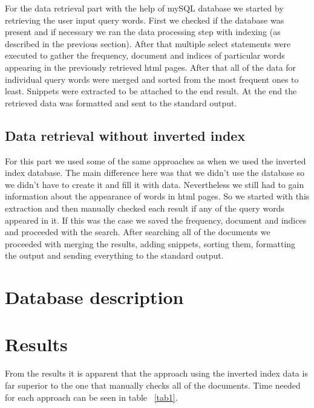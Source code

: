 \documentclass[9pt]{IEEEtran}
\begin{document}
For the data retrieval part with the help of mySQL database we started by retrieving the user input query words.
First we checked if the database was present and if necessary we ran the data processing step with indexing (as described in the previous section).
After that multiple select statements were executed to gather the frequency, document and indices of particular words appearing in the previously retrieved html pages.
After that all of the data for individual query words were merged and sorted from the most frequent ones to least.
Snippets were extracted to be attached to the end result.
At the end the retrieved data was formatted and sent to the standard output.

\subsection{Data retrieval without inverted index}

For this part we used some of the same approaches as when we used the inverted index database.
The main difference here was that we didn't use the database so we didn't have to create it and fill it with data.
Nevertheless we still had to gain information about the appearance of words in html pages.
So we started with this extraction and then manually checked each result if any of the query words appeared in it.
If this was the case we saved the frequency, document and indices and proceeded with the search.
After searching all of the documents we proceeded with merging the results, adding snippets, sorting them, formatting the output and sending everything to the standard output.

\section{Database description}

\section{Results}

From the results it is apparent that the approach using the inverted index data is far superior to the one that manually checks all of the documents.
Time needed for each approach can be seen in table ~\ref{tab1}.
\end{document}
